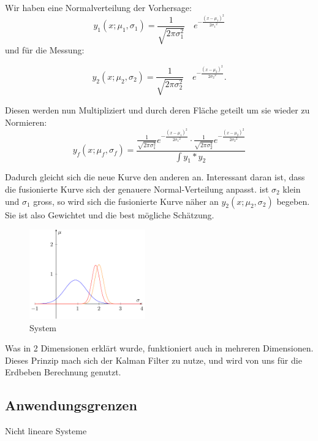 \documentclass[11pt,a4paper]{article}
\begin{document}
Wir haben eine Normalverteilung der Vorhersage:
\begin{equation}
{y_1}(x;{\mu_1},{\sigma_1})=\frac{1}{\sqrt{2\pi\sigma_1^2}}\quad e^{-\frac{(x-{\mu_1})^2}{2{\sigma_1}^2}}
\end{equation} 
und für die Messung:

\begin{equation}
{y_2}(x;{\mu_2},{\sigma_2})=\frac{1}{\sqrt{2\pi\sigma_2^2}}\quad e^{-\frac{(x-{\mu_2})^2}{2{\sigma_2}^2}}.
\end{equation} 

Diesen werden nun Multipliziert und durch deren Fläche geteilt um sie wieder zu Normieren:
\begin{equation}
{y_f}(x;{\mu_f},{\sigma_f})=\frac{ \frac{1}{\sqrt{2\pi\sigma_1^2}}e^{-\frac{(x-{\mu_1})^2}{2{\sigma_1}^2}} \cdot \frac{1}{\sqrt{2\pi\sigma_2^2}}e^{-\frac{(x-{\mu_2})^2}{2{\sigma_2}^2}}}{\int {y_1}*{y_2}\,}
\end{equation} 

Dadurch gleicht sich die neue Kurve den anderen an. Interessant daran ist, dass die fusionierte Kurve sich der genauere Normal-Verteilung anpasst. ist ${\sigma_2}$ klein und ${\sigma_1}$ gross, so wird sich die fusionierte Kurve näher an ${y_2}(x;{\mu_2},{\sigma_2})$ begeben. Sie ist also Gewichtet und die best mögliche Schätzung. 


\begin{figure}
 \begin{center}
 \includegraphics[width=5cm]{papers/erdbeben/Gausskurve3.pdf}
 \caption{System}
 \end{center}
\end{figure}

 
Was in 2 Dimensionen erklärt wurde, funktioniert auch in mehreren Dimensionen. Dieses Prinzip mach sich der Kalman Filter zu nutze, und wird von uns für die Erdbeben Berechnung genutzt. 

\subsection{Anwendungsgrenzen}
Nicht lineare Systeme %
\end{document}
